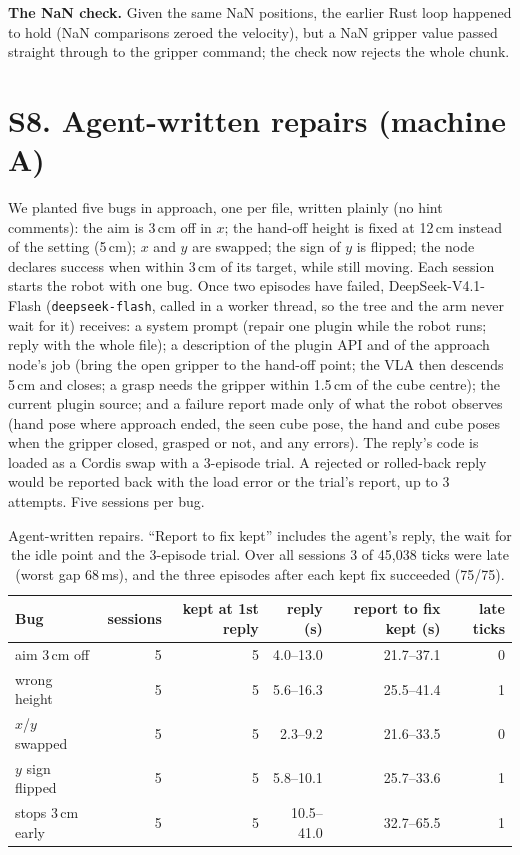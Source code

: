 \documentclass[10pt,letterpaper]{article}
\newcommand{\ms}{\,ms}
\begin{document}
\textbf{The NaN check.} Given the same NaN positions, the earlier Rust loop happened to hold (NaN comparisons zeroed the velocity), but a NaN gripper value passed straight through to the gripper command; the check now rejects the whole chunk.

\section*{S8. Agent-written repairs (machine A)}
We planted five bugs in approach, one per file, written plainly (no hint comments): the aim is 3\,cm off in $x$; the hand-off height is fixed at 12\,cm instead of the setting (5\,cm); $x$ and $y$ are swapped; the sign of $y$ is flipped; the node declares success when within 3\,cm of its target, while still moving. Each session starts the robot with one bug. Once two episodes have failed, DeepSeek-V4.1-Flash (\texttt{deepseek-flash}, called in a worker thread, so the tree and the arm never wait for it) receives: a system prompt (repair one plugin while the robot runs; reply with the whole file); a description of the plugin API and of the approach node's job (bring the open gripper to the hand-off point; the VLA then descends 5\,cm and closes; a grasp needs the gripper within 1.5\,cm of the cube centre); the current plugin source; and a failure report made only of what the robot observes (hand pose where approach ended, the seen cube pose, the hand and cube poses when the gripper closed, grasped or not, and any errors). The reply's code is loaded as a Cordis swap with a 3-episode trial. A rejected or rolled-back reply would be reported back with the load error or the trial's report, up to 3 attempts. Five sessions per bug.

\begin{table}[h]
\centering\small
\begin{tabular}{lrrrrr}
\toprule
Bug & sessions & kept at 1st reply & reply (s) & report to fix kept (s) & late ticks\\
\midrule
aim 3\,cm off & 5 & 5 & 4.0--13.0 & 21.7--37.1 & 0\\
wrong height & 5 & 5 & 5.6--16.3 & 25.5--41.4 & 1\\
$x$/$y$ swapped & 5 & 5 & 2.3--9.2 & 21.6--33.5 & 0\\
$y$ sign flipped & 5 & 5 & 5.8--10.1 & 25.7--33.6 & 1\\
stops 3\,cm early & 5 & 5 & 10.5--41.0 & 32.7--65.5 & 1\\
\bottomrule
\end{tabular}
\caption{Agent-written repairs. ``Report to fix kept'' includes the agent's reply, the wait for the idle point and the 3-episode trial. Over all sessions 3 of 45{,}038 ticks were late (worst gap 68\ms), and the three episodes after each kept fix succeeded (75/75).}
\end{table}
\end{document}
